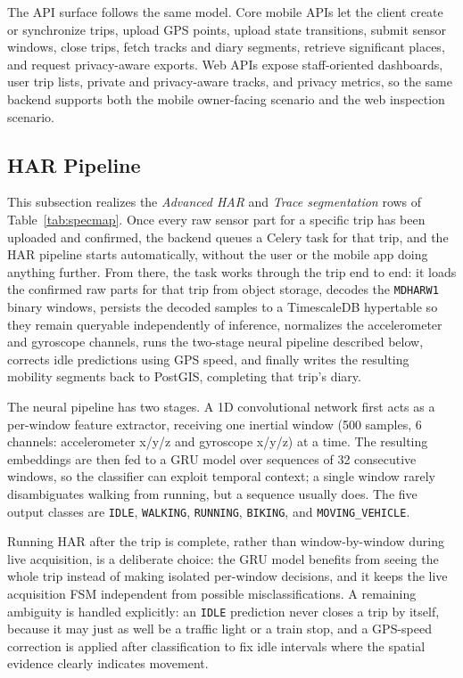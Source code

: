 \documentclass[conference,a4paper]{IEEEtran}
\begin{document}
The API surface follows the same model. Core mobile APIs let the client create or synchronize trips, upload GPS points, upload state transitions, submit sensor windows, close trips, fetch tracks and diary segments, retrieve significant places, and request privacy-aware exports. Web APIs expose staff-oriented dashboards, user trip lists, private and privacy-aware tracks, and privacy metrics, so the same backend supports both the mobile owner-facing scenario and the web inspection scenario.

\subsection{HAR Pipeline}

This subsection realizes the \textit{Advanced HAR} and \textit{Trace segmentation} rows of Table~\ref{tab:specmap}. Once every raw sensor part for a specific trip has been uploaded and confirmed, the backend queues a Celery task for that trip, and the HAR pipeline starts automatically, without the user or the mobile app doing anything further. From there, the task works through the trip end to end: it loads the confirmed raw parts for that trip from object storage, decodes the \texttt{MDHARW1} binary windows, persists the decoded samples to a TimescaleDB hypertable so they remain queryable independently of inference, normalizes the accelerometer and gyroscope channels, runs the two-stage neural pipeline described below, corrects idle predictions using GPS speed, and finally writes the resulting mobility segments back to PostGIS, completing that trip's diary.

The neural pipeline has two stages. A 1D convolutional network first acts as a per-window feature extractor, receiving one inertial window (500 samples, 6 channels: accelerometer x/y/z and gyroscope x/y/z) at a time. The resulting embeddings are then fed to a GRU model over sequences of 32 consecutive windows, so the classifier can exploit temporal context; a single window rarely disambiguates walking from running, but a sequence usually does. The five output classes are \texttt{IDLE}, \texttt{WALKING}, \texttt{RUNNING}, \texttt{BIKING}, and \texttt{MOVING\_VEHICLE}.

Running HAR after the trip is complete, rather than window-by-window during live acquisition, is a deliberate choice: the GRU model benefits from seeing the whole trip instead of making isolated per-window decisions, and it keeps the live acquisition FSM independent from possible misclassifications. A remaining ambiguity is handled explicitly: an \texttt{IDLE} prediction never closes a trip by itself, because it may just as well be a traffic light or a train stop, and a GPS-speed correction is applied after classification to fix idle intervals where the spatial evidence clearly indicates movement.
\end{document}
